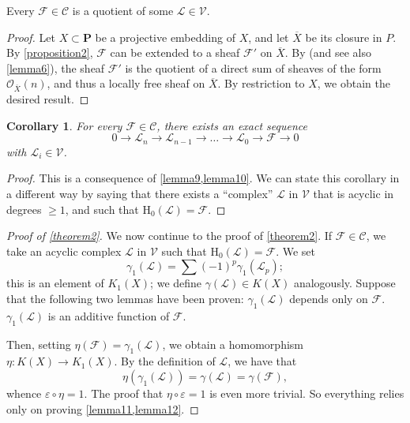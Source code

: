 \documentclass{article}
\theoremstyle{plain}
\newenvironment{lemma}[1]
    {\renewcommand\theinnercustomlemma{#1}\innercustomlemma}
    {\endinnercustomlemma}
\newtheorem*{corollary}{Corollary}
\theoremstyle{definition}
\newcommand{\sh}{\mathscr}
\newcommand{\cat}{\mathcal}
\newcommand{\HH}{\mathrm{H}}
\newcommand{\PP}{\mathbf{P}}
\renewcommand{\geq}{\geqslant}
\newcommand{\oldpage}[1]{\marginpar{\footnotesize$\Big\vert$ \textit{p.~#1}}}
\begin{document}
\begin{lemma}{10}
\label{lemma10}
  Every $\sh{F}\in\cat{C}$ is a quotient of some $\sh{L}\in\cat{V}$.
\end{lemma}

\begin{proof}
  Let $X\subset \PP$ be a projective embedding of $X$, and let $\overline{X}$ be its closure in $P$.
  By \cref{proposition2}, $\sh{F}$ can be extended to a sheaf $\sh{F}'$ on $\overline{X}$.
  By \cite[th\'{e}or\`{e}me~1, p.~247]{12} (and see also \cref{lemma6}), the sheaf $\sh{F}'$ is the quotient of a direct sum of sheaves of the form $\sh{O}_{\overline{X}}(n)$, and thus a locally free sheaf on $\overline{X}$.
  By restriction to $X$, we obtain the desired result.
\end{proof}

\begin{corollary}
  For every $\sh{F}\in\cat{C}$, there exists an exact sequence
  \[
    0\to\sh{L}_n\to\sh{L}_{n-1}\to\ldots\to\sh{L}_0\to\sh{F}\to0
  \]
  with $\sh{L}_i\in\cat{V}$.
\end{corollary}

\begin{proof}
  This is a consequence of \cref{lemma9,lemma10}.
  We can state this corollary in a different way by saying that there exists a ``complex'' $\sh{L}$ in $\cat{V}$ that is acyclic in degrees $\geq1$, and such that $\HH_0(\sh{L})=\sh{F}$.
\end{proof}

\begin{proof}[Proof of \cref{theorem2}]
  We now continue to the proof of \cref{theorem2}.
  If $\sh{F}\in\cat{C}$, we take an acyclic complex $\sh{L}$ in $\cat{V}$ such that $\HH_0(\sh{L})=\sh{F}$.
  We set
  \[
    \gamma_1(\sh{L}) = \sum(-1)^p\gamma_1(\sh{L}_p);
  \]
  this is an element of $K_1(X)$;
  we define $\gamma(\sh{L})\in K(X)$ analogously.
  Suppose that the following two lemmas have been proven:
  \begin{lemma}{11}
  \label{lemma11}
    $\gamma_1(\sh{L})$ depends only on $\sh{F}$.
  \end{lemma}
  \begin{lemma}{12}
  \label{lemma12}
    $\gamma_1(\sh{L})$ is an additive function of $\sh{F}$.
  \end{lemma}

  Then, setting $\eta(\sh{F})=\gamma_1(\sh{L})$, we obtain a homomorphism $\eta\colon K(X)\to K_1(X)$.
  By the definition of $\sh{L}$, we have that
  \[
    \eta(\gamma_1(\sh{L})) = \gamma(\sh{L}) = \gamma(\sh{F}),
  \]
  whence $\varepsilon\circ\eta=1$.
  \oldpage{107}
  The proof that $\eta\circ\varepsilon=1$ is even more trivial.
  So everything relies only on proving \cref{lemma11,lemma12}.
\end{proof}
\end{document}
